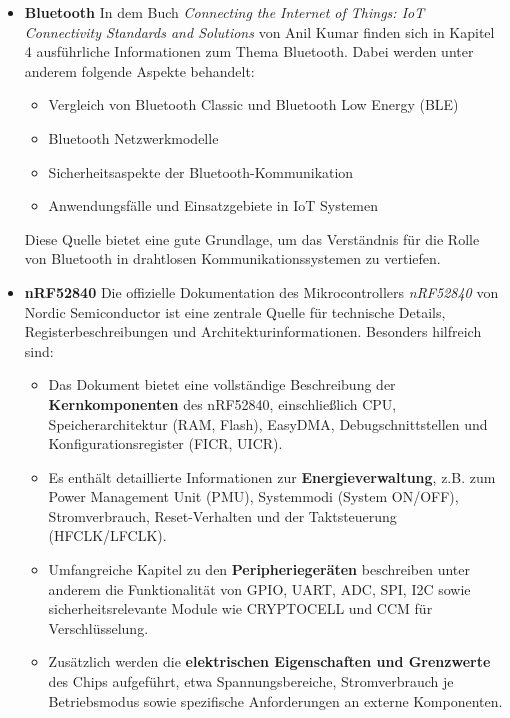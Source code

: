 	\begin{itemize}
		\item \textbf{Bluetooth}  
		In dem Buch \textit{Connecting the Internet of Things: IoT Connectivity Standards and Solutions} von Anil Kumar finden sich in Kapitel 4 ausführliche Informationen zum Thema Bluetooth. Dabei werden unter anderem folgende Aspekte behandelt:
		
		\begin{itemize}
			\item Vergleich von Bluetooth Classic und Bluetooth Low Energy (BLE)
			\item Bluetooth Netzwerkmodelle
			\item Sicherheitsaspekte der Bluetooth-Kommunikation
			\item Anwendungsfälle und Einsatzgebiete in IoT Systemen
		\end{itemize}
		
		Diese Quelle bietet eine gute Grundlage, um das Verständnis für die Rolle von Bluetooth in drahtlosen Kommunikationssystemen zu vertiefen. \cite{Kumar.2023}
		
		\item \textbf{nRF52840 }  
		Die offizielle Dokumentation des Mikrocontrollers \textit{nRF52840} von Nordic Semiconductor ist eine zentrale Quelle für technische Details, Registerbeschreibungen und Architekturinformationen. Besonders hilfreich sind:
		
		\begin{itemize}
			\item Das Dokument bietet eine vollständige Beschreibung der \textbf{Kernkomponenten} des nRF52840, einschließlich CPU, Speicherarchitektur (RAM, Flash), EasyDMA, Debugschnittstellen und Konfigurationsregister (FICR, UICR).
			\item Es enthält detaillierte Informationen zur \textbf{Energieverwaltung}, z.B. zum Power Management Unit (PMU), Systemmodi (System ON/OFF), Stromverbrauch, Reset-Verhalten und der Taktsteuerung (HFCLK/LFCLK).
			\item Umfangreiche Kapitel zu den \textbf{Peripheriegeräten} beschreiben unter anderem die Funktionalität von GPIO, UART, ADC, SPI, I2C sowie sicherheitsrelevante Module wie CRYPTOCELL und CCM für Verschlüsselung.
			\item Zusätzlich werden die \textbf{elektrischen Eigenschaften und Grenzwerte} des Chips aufgeführt, etwa Spannungsbereiche, Stromverbrauch je Betriebsmodus sowie spezifische Anforderungen an externe Komponenten.
		\end{itemize}
		

\end{itemize}
